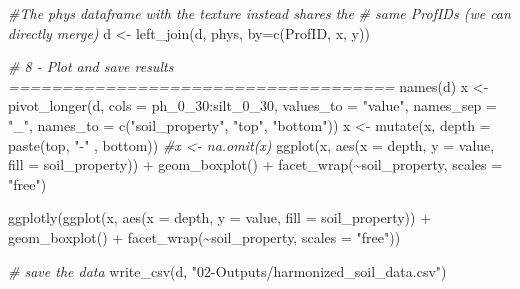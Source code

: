 \documentclass[
  10pt,
  b5paper,
  oneside]{book}
\newenvironment{Shaded}{\begin{snugshade}}{\end{snugshade}}
\newcommand{\AttributeTok}[1]{\textcolor[rgb]{0.77,0.63,0.00}{#1}}
\newcommand{\CommentTok}[1]{\textcolor[rgb]{0.56,0.35,0.01}{\textit{#1}}}
\newcommand{\FunctionTok}[1]{\textcolor[rgb]{0.00,0.00,0.00}{#1}}
\newcommand{\NormalTok}[1]{#1}
\newcommand{\OtherTok}[1]{\textcolor[rgb]{0.56,0.35,0.01}{#1}}
\newcommand{\SpecialCharTok}[1]{\textcolor[rgb]{0.00,0.00,0.00}{#1}}
\newcommand{\StringTok}[1]{\textcolor[rgb]{0.31,0.60,0.02}{#1}}
\begin{document}
\begin{Shaded}
\begin{Highlighting}[]
\CommentTok{\#The phys dataframe with the texture instead shares the }
\CommentTok{\# same ProfIDs (we can directly merge)}
\NormalTok{d }\OtherTok{\textless{}{-}} \FunctionTok{left\_join}\NormalTok{(d, phys, }\AttributeTok{by=}\FunctionTok{c}\NormalTok{(}\StringTok{\textquotesingle{}ProfID\textquotesingle{}}\NormalTok{, }\StringTok{\textquotesingle{}x\textquotesingle{}}\NormalTok{, }\StringTok{\textquotesingle{}y\textquotesingle{}}\NormalTok{))}

\CommentTok{\# 8 {-} Plot  and save results ====================================}
\FunctionTok{names}\NormalTok{(d)}
\NormalTok{x }\OtherTok{\textless{}{-}} \FunctionTok{pivot\_longer}\NormalTok{(d, }\AttributeTok{cols =}\NormalTok{ ph\_0\_30}\SpecialCharTok{:}\NormalTok{silt\_0\_30, }
                  \AttributeTok{values\_to =} \StringTok{"value"}\NormalTok{,}
                  \AttributeTok{names\_sep =} \StringTok{"\_"}\NormalTok{, }
                  \AttributeTok{names\_to =} \FunctionTok{c}\NormalTok{(}\StringTok{"soil\_property"}\NormalTok{, }
                               \StringTok{"top"}\NormalTok{, }\StringTok{"bottom"}\NormalTok{))}
\NormalTok{x }\OtherTok{\textless{}{-}} \FunctionTok{mutate}\NormalTok{(x, }\AttributeTok{depth =} \FunctionTok{paste}\NormalTok{(top, }\StringTok{"{-}"}\NormalTok{ , bottom))}
\CommentTok{\#x \textless{}{-} na.omit(x)}
\FunctionTok{ggplot}\NormalTok{(x, }\FunctionTok{aes}\NormalTok{(}\AttributeTok{x =}\NormalTok{ depth, }\AttributeTok{y =}\NormalTok{ value, }\AttributeTok{fill =}\NormalTok{ soil\_property)) }\SpecialCharTok{+}
  \FunctionTok{geom\_boxplot}\NormalTok{() }\SpecialCharTok{+} 
  \FunctionTok{facet\_wrap}\NormalTok{(}\SpecialCharTok{\textasciitilde{}}\NormalTok{soil\_property, }\AttributeTok{scales =} \StringTok{"free"}\NormalTok{)}


\FunctionTok{ggplotly}\NormalTok{(}\FunctionTok{ggplot}\NormalTok{(x, }\FunctionTok{aes}\NormalTok{(}\AttributeTok{x =}\NormalTok{ depth, }\AttributeTok{y =}\NormalTok{ value, }
                       \AttributeTok{fill =}\NormalTok{ soil\_property)) }\SpecialCharTok{+}
           \FunctionTok{geom\_boxplot}\NormalTok{() }\SpecialCharTok{+} 
           \FunctionTok{facet\_wrap}\NormalTok{(}\SpecialCharTok{\textasciitilde{}}\NormalTok{soil\_property, }\AttributeTok{scales =} \StringTok{"free"}\NormalTok{))}

\CommentTok{\# save the data}
\FunctionTok{write\_csv}\NormalTok{(d, }\StringTok{"02{-}Outputs/harmonized\_soil\_data.csv"}\NormalTok{)}
\end{Highlighting}
\end{Shaded}
\end{document}
